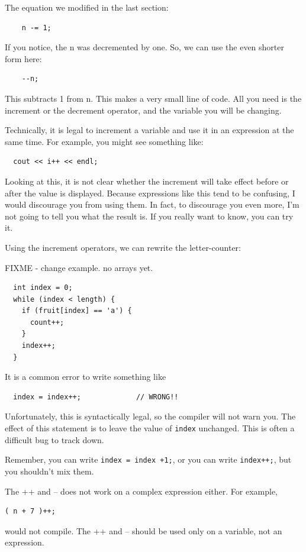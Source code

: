 The equation we modified in the last section:
\begin{verbatim}
    n -= 1;
\end{verbatim}

If you notice, the n was decremented by one. So, we can use the even shorter form here:
\begin{verbatim}
    --n;
\end{verbatim}
This subtracts 1 from n. This makes a very small line of code. All you need is the increment or the decrement operator, and the variable you will be changing.

Technically, it is legal to increment a variable and use it
in an expression at the same time.  For example, you might see
something like:

\begin{verbatim}
  cout << i++ << endl;
\end{verbatim}
%
Looking at this, it is not clear whether the increment will
take effect before or after the value is displayed.  Because
expressions like this tend to be confusing, I would discourage
you from using them.  In fact, to discourage you even more,
I'm not going to tell you what the result is.  If you really
want to know, you can try it.

Using the increment operators, we can rewrite the letter-counter:

FIXME - change example. no arrays yet.
\begin{verbatim}
  int index = 0;
  while (index < length) {
    if (fruit[index] == 'a') {
      count++;
    }
    index++;
  }
\end{verbatim}
%
It is a common error to write something like

\begin{verbatim}
  index = index++;             // WRONG!!
\end{verbatim}
%
Unfortunately, this is syntactically legal, so the compiler
will not warn you.  The effect of this statement is to leave
the value of {\tt index} unchanged.  This is often a difficult
bug to track down.

Remember, you can write {\tt index = index +1;}, or you
can write {\tt index++;}, but you shouldn't mix them.

The ++ and -- does not work on a complex expression either. For example, 

\begin {verbatim}
( n + 7 )++;
\end{verbatim}
would not compile. The ++ and -- should be used only on a variable, not an expression.

